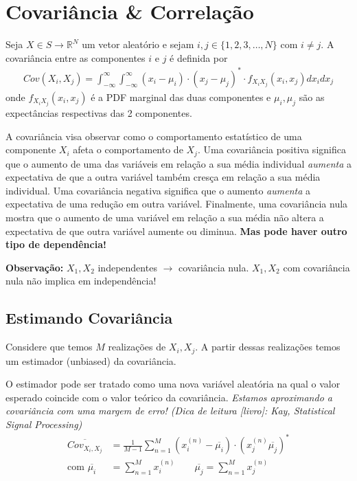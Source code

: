 \documentclass{article}
\newcommand\ov[1]{\overline{#1}}
\begin{document}
\setlength{\abovedisplayskip}{12pt}
\setlength{\belowdisplayskip}{12pt}
\setlength{\abovedisplayshortskip}{0pt}
\setlength{\belowdisplayshortskip}{0pt}
\setlength{\jot}{1pt}

\section{Covariância \& Correlação}
Seja $X \in S \to \mathbb{R}^N$ um vetor aleatório e sejam $i,j \in \{1,2,3,\ldots,N\}$ com $i \neq
j$. A covariância entre as componentes $i$ e $j$ é definida por
\begin{align*}
    Cov(X_i,X_j) = \int^{\infty}_{-\infty} \int^{\infty}_{-\infty} (x_i-\mu_i)\cdot(x_j-\mu_j)^* \cdot f_{X_i X_j}(x_i,x_j) dx_i dx_j
\end{align*}
onde $f_{X_i X_j}(x_i,x_j)$ é a PDF marginal das duas componentes e $\mu_i, \mu_j$ são as
expectâncias respectivas das 2 componentes.

A covariância visa observar como o comportamento estatístico de uma componente $X_i$ afeta o
comportamento de $X_j$. Uma covariância positiva significa que o aumento de uma das variáveis em
relação a sua média individual \textit{aumenta} a expectativa de que a outra variável também
cresça em relação a sua média individual. Uma covariância negativa significa que o aumento
\textit{aumenta} a expectativa de uma redução em outra variável. Finalmente, uma covariância nula
mostra que o aumento de uma variável em relação a sua média não altera a expectativa de que outra
variável aumente ou diminua. \textbf{Mas pode haver outro tipo de dependência!}

\textbf{Observação:} $X_1, X_2$ independentes $\to$ covariância nula. $X_1, X_2$ com covariância
nula não implica em independência!
\vspace{0.25em}
\subsection{Estimando Covariância}
Considere que temos $M$ realizações de $X_i, X_j$. A partir dessas realizações temos um estimador
(unbiased) da covariância.

O estimador pode ser tratado como uma nova variável aleatória na qual o valor esperado coincide com
o valor teórico da covariância. \textit{Estamos aproximando a covariância com uma margem de erro!
(Dica de leitura [livro]: Kay, Statistical Signal Processing)}
\begin{align*}
    \ov{Cov_{X_i,X_j}} &= \frac{1}{M-1} \sum_{n=1}^M
    (x_i^{(n)}-\ov{\mu_i})\cdot(x_j^{(n)}\ov{\mu_j})^* \\
    \text{com } \ov{\mu_i} &= \sum_{n=1}^M x_i^{(n)} \qquad \ov{\mu_j} = \sum_{n=1}^M x_j^{(n)}
\end{align*}
\end{document}
